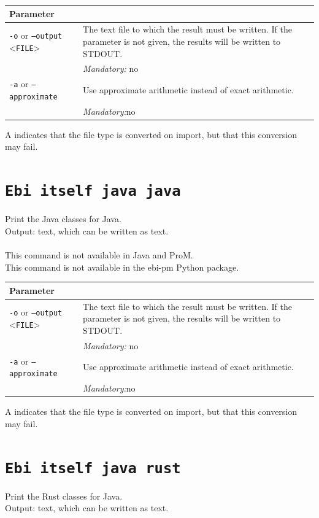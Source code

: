{\begin{tabularx}{\linewidth}{lX}
\toprule
Parameter \\\midrule
\texttt{-o} or \texttt{--output} <\texttt{FILE}> &
The text file to which the result must be written. If the parameter is not given, the results will be written to STDOUT.\\
&\textit{Mandatory:} \quad no\\
\texttt{-a} or \texttt{--approximate} & Use approximate arithmetic instead of exact arithmetic.\\
&\textit{Mandatory:}\quad no\\
\bottomrule
\end{tabularx}
A \textdagger{} indicates that the file type is converted on import, but that this conversion may fail.
\clearpage\section{\texttt{Ebi itself java java}}
\label{command:Ebi itself java java}
Print the Java classes for Java.\\
\noindent Output: text, which can be written as  text.\\
\\This command is not available in Java and ProM.
\\This command is not available in the ebi-pm Python package.
\begin{tabularx}{\linewidth}{lX}
\toprule
Parameter \\\midrule
\texttt{-o} or \texttt{--output} <\texttt{FILE}> &
The text file to which the result must be written. If the parameter is not given, the results will be written to STDOUT.\\
&\textit{Mandatory:} \quad no\\
\texttt{-a} or \texttt{--approximate} & Use approximate arithmetic instead of exact arithmetic.\\
&\textit{Mandatory:}\quad no\\
\bottomrule
\end{tabularx}
A \textdagger{} indicates that the file type is converted on import, but that this conversion may fail.
\clearpage\section{\texttt{Ebi itself java rust}}
\label{command:Ebi itself java rust}
Print the Rust classes for Java.\\
\noindent Output: text, which can be written as  text.\\
}
